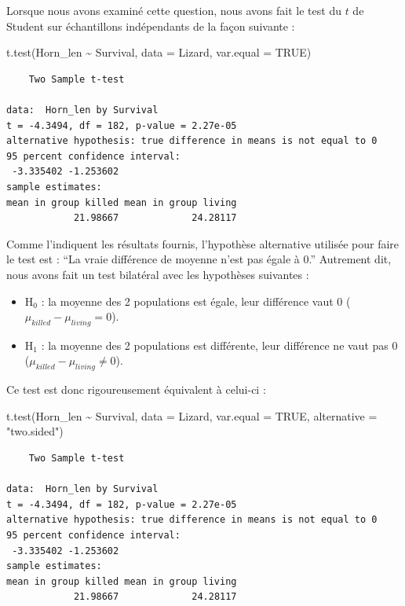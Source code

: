 \documentclass[
  a4paper,
]{article}
\newenvironment{Shaded}{\begin{snugshade}}{\end{snugshade}}
\newcommand{\AttributeTok}[1]{\textcolor[rgb]{0.00,0.34,0.68}{#1}}
\newcommand{\ConstantTok}[1]{\textcolor[rgb]{0.67,0.33,0.00}{#1}}
\newcommand{\FunctionTok}[1]{\textcolor[rgb]{0.39,0.29,0.61}{#1}}
\newcommand{\NormalTok}[1]{\textcolor[rgb]{0.12,0.11,0.11}{#1}}
\newcommand{\SpecialCharTok}[1]{\textcolor[rgb]{0.24,0.68,0.91}{#1}}
\newcommand{\StringTok}[1]{\textcolor[rgb]{0.75,0.01,0.01}{#1}}
\providecommand{\tightlist}{%
  \setlength{\itemsep}{0pt}\setlength{\parskip}{0pt}}
\begin{document}
Lorsque nous avons examiné cette question, nous avons fait le test du \(t\) de Student sur échantillons indépendants de la façon suivante :

\begin{Shaded}
\begin{Highlighting}[]
\FunctionTok{t.test}\NormalTok{(Horn\_len }\SpecialCharTok{\textasciitilde{}}\NormalTok{ Survival, }\AttributeTok{data =}\NormalTok{ Lizard, }\AttributeTok{var.equal =} \ConstantTok{TRUE}\NormalTok{)}
\end{Highlighting}
\end{Shaded}

\begin{verbatim}
    Two Sample t-test

data:  Horn_len by Survival
t = -4.3494, df = 182, p-value = 2.27e-05
alternative hypothesis: true difference in means is not equal to 0
95 percent confidence interval:
 -3.335402 -1.253602
sample estimates:
mean in group killed mean in group living 
            21.98667             24.28117 
\end{verbatim}

Comme l'indiquent les résultats fournis, l'hypothèse alternative utilisée pour faire le test est : ``La vraie différence de moyenne n'est pas égale à 0.'' Autrement dit, nous avons fait un test bilatéral avec les hypothèses suivantes :

\begin{itemize}
\tightlist
\item
  H\(_0\) : la moyenne des 2 populations est égale, leur différence vaut 0 (\(\mu_{killed}-\mu_{living} = 0\)).
\item
  H\(_1\) : la moyenne des 2 populations est différente, leur différence ne vaut pas 0 (\(\mu_{killed}-\mu_{living} \neq 0\)).
\end{itemize}

Ce test est donc rigoureusement équivalent à celui-ci :

\begin{Shaded}
\begin{Highlighting}[]
\FunctionTok{t.test}\NormalTok{(Horn\_len }\SpecialCharTok{\textasciitilde{}}\NormalTok{ Survival, }
       \AttributeTok{data =}\NormalTok{ Lizard, }\AttributeTok{var.equal =} \ConstantTok{TRUE}\NormalTok{,}
       \AttributeTok{alternative =} \StringTok{"two.sided"}\NormalTok{)}
\end{Highlighting}
\end{Shaded}

\begin{verbatim}
    Two Sample t-test

data:  Horn_len by Survival
t = -4.3494, df = 182, p-value = 2.27e-05
alternative hypothesis: true difference in means is not equal to 0
95 percent confidence interval:
 -3.335402 -1.253602
sample estimates:
mean in group killed mean in group living 
            21.98667             24.28117 
\end{verbatim}
\end{document}
